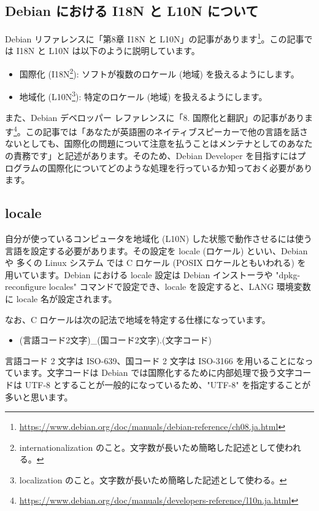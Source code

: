 \documentclass[mingoth,a4paper]{jsarticle}
\begin{document}
\subsection{Debian における I18N と L10N について}

Debian リファレンスに「第8章 I18N と L10N」の記事があります\footnote{\url{https://www.debian.org/doc/manuals/debian-reference/ch08.ja.html}}。この記事では I18N と L10N は以下のように説明しています。

\begin{itemize}
\item 国際化 (I18N\footnote{internationalization のこと。文字数が長いため簡略した記述として使われる。}): ソフトが複数のロケール (地域) を扱えるようにします。
\item 地域化 (L10N\footnote{localization のこと。文字数が長いため簡略した記述として使わる。}): 特定のロケール (地域) を扱えるようにします。 
\end{itemize}

また、Debian デベロッパー レファレンスに「8. 国際化と翻訳」の記事があります\footnote{\url{https://www.debian.org/doc/manuals/developers-reference/l10n.ja.html}}。この記事では「あなたが英語圏のネイティブスピーカーで他の言語を話さないとしても、国際化の問題について注意を払うことはメンテナとしてのあなたの責務です」と記述があります。そのため、Debian Developer を目指すにはプログラムの国際化についてどのような処理を行っているか知っておく必要があります。


\subsection{locale}

自分が使っているコンピュータを地域化 (L10N) した状態で動作させるには使う言語を設定する必要があります。その設定を locale (ロケール) といい、Debian や 多くの Linux システム では C ロケール (POSIX ロケールともいわれる) を用いています。Debian における locale 設定は Debian インストーラや "dpkg-reconfigure locales" コマンドで設定でき、locale を設定すると、LANG 環境変数に locale 名が設定されます。

なお、C ロケールは次の記法で地域を特定する仕様になっています。

\begin{itemize}
\item (言語コード2文字)\_(国コード2文字).(文字コード)
\end{itemize}

言語コード 2 文字は ISO-639、国コード 2 文字は ISO-3166 を用いることになっています。文字コードは Debian では国際化するために内部処理で扱う文字コードは UTF-8 とすることが一般的になっているため、"UTF-8" を指定することが多いと思います。
\end{document}
